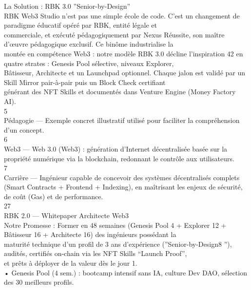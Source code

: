 La Solution : RBK 3.0 ”Senior-by-Design”\\
RBK Web3 Studio n’est pas une simple école de code. C’est un changement de paradigme éducatif opéré par RBK, entité légale et\\
commerciale, et exécuté pédagogiquement par Nexus Réussite, son maître d’œuvre pédagogique exclusif. Ce binôme industrialise la\\
montée en compétence Web3 : notre modèle RBK 3.0 décline l’inspiration 42 en quatre strates : Genesis Pool sélective, niveaux Explorer,\\
Bâtisseur, Architecte et un Launchpad optionnel. Chaque jalon est validé par un Skill Mirror pair-à-pair puis un Block Check certifiant\\
générant des NFT Skills et documentés dans Venture Engine (Money Factory AI).\\
5\\
Pédagogie — Exemple concret illustratif utilisé pour faciliter la compréhension d’un concept.\\
6\\
Web3 — Web 3.0 (Web3) : génération d’Internet décentralisée basée sur la propriété numérique via la blockchain, redonnant le contrôle aux utilisateurs.\\
7\\
Carrière — Ingénieur capable de concevoir des systèmes décentralisés complets (Smart Contracts + Frontend + Indexing), en maîtrisant les enjeux de sécurité,\\
de coût (Gas) et de performance.\\
\vspace{0.5em}
\vspace{0.5em}
\vspace{0.5em}
27\\
RBK 2.0 — Whitepaper Architecte Web3\\
\vspace{0.5em}
\vspace{0.5em}
Notre Promesse : Former en 48 semaines (Genesis Pool 4 + Explorer 12 + Bâtisseur 16 + Architecte 16) des ingénieurs possédant la\\
maturité technique d’un profil de 3 ans d’expérience (”Senior-by-Design8 ”), audités, certifiés on-chain via les NFT Skills “Launch Proof”,\\
et prêts à déployer de la valeur dès le jour 1.\\
\vspace{0.5em}
• Genesis Pool (4 sem.) : bootcamp intensif sans IA, culture Dev DAO, sélection des 30 meilleurs profils.\\
